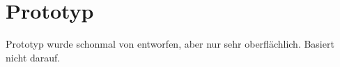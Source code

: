 \section{Prototyp}
\label{sec:prototype}

    Prototyp wurde schonmal von \cite{Han2017} entworfen, aber nur sehr oberflächlich.
    Basiert nicht darauf.
